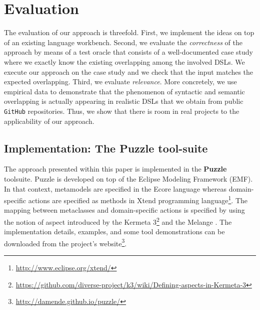 \section{Evaluation}
\label{sec:validation}

The evaluation of our approach is threefold. First, we implement the ideas on top of an existing language workbench. Second, we evaluate the \textit{correctness} of the approach by means of a test oracle that consists of a well-documented case study where we exactly know the existing overlapping among the involved DSLs. We execute our approach on the case study and we check that the input matches the expected overlapping. Third, we evaluate \textit{relevance}. More concretely, we use empirical data to demonstrate that the phenomenon of syntactic and semantic overlapping is actually appearing in realistic DSLs that we obtain from public \texttt{GitHub} repositories. Thus, we show that there is room in real projects to the applicability of our approach.  

\subsection{Implementation: The Puzzle tool-suite}

The approach presented within this paper is implemented in the \textbf{Puzzle} toolsuite. Puzzle is developed on top of the Eclipse Modeling Framework (EMF). In that context, metamodels are specified in the Ecore language whereas domain-specific actions are specified as methods in Xtend programming language\footnote{\url{http://www.eclipse.org/xtend/}}. The mapping between metaclasses and domain-specific actions is specified by using the notion of aspect introduced by the Kermeta 3\footnote{\url{https://github.com/diverse-project/k3/wiki/Defining-aspects-in-Kermeta-3}} and the Melange \cite{Degueule:2015}. The implementation details, examples, and some tool demonstrations can be downloaded from the project's website\footnote{\url{http://damende.github.io/puzzle/}}.


